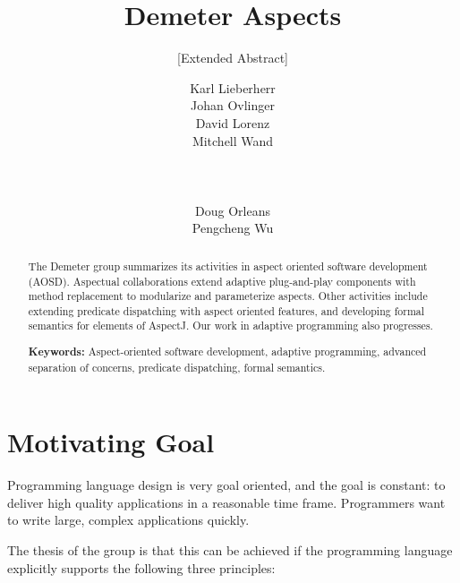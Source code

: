 \documentclass{acm_proc_article-sp}
\begin{document}
\title{Demeter Aspects}
\subtitle{[Extended Abstract]}



\author{
\alignauthor Karl Lieberherr\\
Johan Ovlinger\\
\alignauthor David Lorenz\\
Mitchell Wand\\
   \\
   \\
   \\
\alignauthor Doug Orleans\\
Pengcheng Wu\\
}


\maketitle

\begin{abstract}

The Demeter group summarizes its activities in aspect oriented
software development (AOSD).  Aspectual collaborations extend adaptive
plug-and-play components with method replacement to modularize and
parameterize aspects.  Other activities include extending predicate
dispatching with aspect oriented features, and developing formal
semantics for elements of AspectJ.  Our work in adaptive programming
also progresses.

{\bf Keywords:} Aspect-oriented software development, adaptive
programming, advanced separation of concerns, predicate dispatching, formal
semantics.
\end{abstract}

\section{Motivating Goal}

Programming language design is very goal oriented, and the goal is constant: to 
deliver high quality applications in a reasonable time frame. 
Programmers want to write large, complex applications quickly. 

The thesis of the group is that this can be achieved if the
programming language explicitly supports the following three principles:
\end{document}
